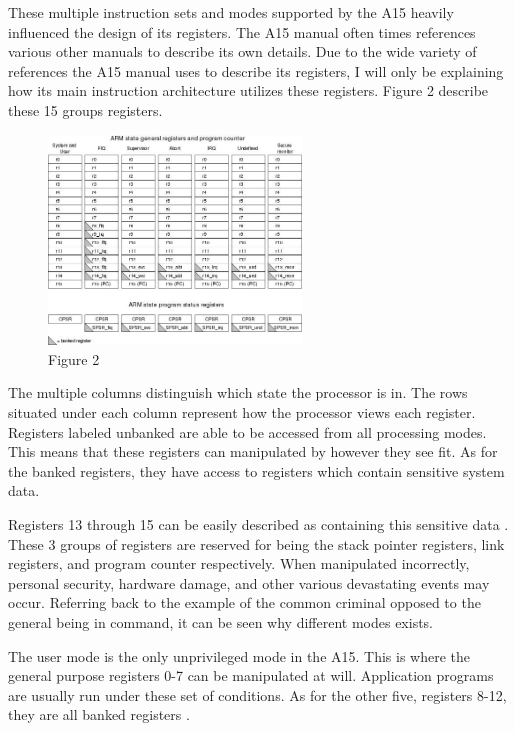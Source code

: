 \documentclass[12pt]{scrreprt}
\begin{document}
	These multiple instruction sets and modes supported by the A15 heavily influenced the design of its registers.
	The A15 manual often times references various other manuals to describe its own details.
	Due to the wide variety of references the A15 manual uses to describe its registers, I will only be explaining how its main instruction architecture utilizes these registers.
	Figure 2 describe these 15 groups registers.

	\begin{figure}[h]
		\centering
			\includegraphics[width=0.6\textwidth]{registers}
		\caption{Figure 2}
	\end{figure}

	The multiple columns distinguish which state the processor is in.
	The rows situated under each column represent how the processor views each register.
	Registers labeled unbanked are able to be accessed from all processing modes.
	This means that these registers can manipulated by however they see fit.
	As for the banked registers, they have access to registers which contain sensitive system data.

	Registers 13 through 15 can be easily described as containing this sensitive data \autocite[A2-45]{a7man}.
	These 3 groups of registers are reserved for being the stack pointer registers, link registers, and program counter respectively.
	When manipulated incorrectly, personal security, hardware damage, and other various devastating events may occur.
	Referring back to the example of the common criminal opposed to the general being in command, it can be seen why different modes exists.

	The user mode is the only unprivileged mode in the A15.
	This is where the general purpose registers 0-7 can be manipulated at will.
	Application programs are usually run under these set of conditions.
	As for the other five, registers 8-12, they are all banked registers \autocite[123]{riscGuide}.
\end{document}
